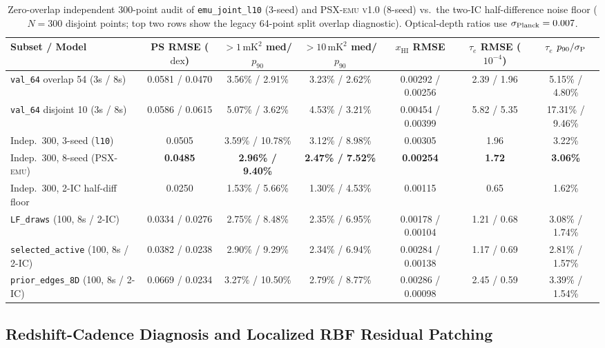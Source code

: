 \documentclass[aps,prd,reprint,superscriptaddress,nofootinbib,amsmath,amssymb,floatfix,longbibliography]{revtex4-2}
\begin{document}
\begin{table}[!tb]
\caption{Zero-overlap independent 300-point audit of \texttt{emu\_joint\_l10} (3-seed) and \textsc{PSX-emu v1.0} (8-seed) vs.\ the two-IC half-difference noise floor ($N=300$ disjoint points; top two rows show the legacy 64-point split overlap diagnostic). Optical-depth ratios use $\sigma_{\rm Planck}=0.007$.}
\label{tab:psx_audit}
\scriptsize
\setlength{\tabcolsep}{2.2pt}
\begin{ruledtabular}
\begin{tabular}{lcccccc}
Subset / Model & PS RMSE ($\mathrm{dex}$) & $>1\,\mathrm{mK}^2$ med/$p_{90}$ & $>10\,\mathrm{mK}^2$ med/$p_{90}$ & $x_{\mathrm{HI}}$ RMSE & $\tau_e$ RMSE ($10^{-4}$) & $\tau_e$ $p_{90}/\sigma_{\rm P}$ \\
\hline
\texttt{val\_64} overlap 54 (3s / 8s) & 0.0581 / 0.0470 & 3.56\% / 2.91\% & 3.23\% / 2.62\% & 0.00292 / 0.00256 & 2.39 / 1.96 & 5.15\% / 4.80\% \\
\texttt{val\_64} disjoint 10 (3s / 8s) & 0.0586 / 0.0615 & 5.07\% / 3.62\% & 4.53\% / 3.21\% & 0.00454 / 0.00399 & 5.82 / 5.35 & 17.31\% / 9.46\% \\
\hline
Indep.\ 300, 3-seed (\texttt{l10}) & 0.0505 & 3.59\% / 10.78\% & 3.12\% / 8.98\% & 0.00305 & 1.96 & 3.22\% \\
Indep.\ 300, 8-seed (\textsc{PSX-emu}) & \textbf{0.0485} & \textbf{2.96\% / 9.40\%} & \textbf{2.47\% / 7.52\%} & \textbf{0.00254} & \textbf{1.72} & \textbf{3.06\%} \\
Indep.\ 300, 2-IC half-diff floor & 0.0250 & 1.53\% / 5.66\% & 1.30\% / 4.53\% & 0.00115 & 0.65 & 1.62\% \\
\hline
\texttt{LF\_draws} (100, 8s / 2-IC) & 0.0334 / 0.0276 & 2.75\% / 8.48\% & 2.35\% / 6.95\% & 0.00178 / 0.00104 & 1.21 / 0.68 & 3.08\% / 1.74\% \\
\texttt{selected\_active} (100, 8s / 2-IC) & 0.0382 / 0.0238 & 2.90\% / 9.29\% & 2.34\% / 6.94\% & 0.00284 / 0.00138 & 1.17 / 0.69 & 2.81\% / 1.57\% \\
\texttt{prior\_edges\_8D} (100, 8s / 2-IC) & 0.0669 / 0.0234 & 3.27\% / 10.50\% & 2.79\% / 8.77\% & 0.00286 / 0.00098 & 2.45 / 0.59 & 3.39\% / 1.54\% \\
\end{tabular}
\end{ruledtabular}
\end{table}

\subsection{Redshift-Cadence Diagnosis and Localized RBF Residual Patching}\label{sec:plan_a}
\end{document}
